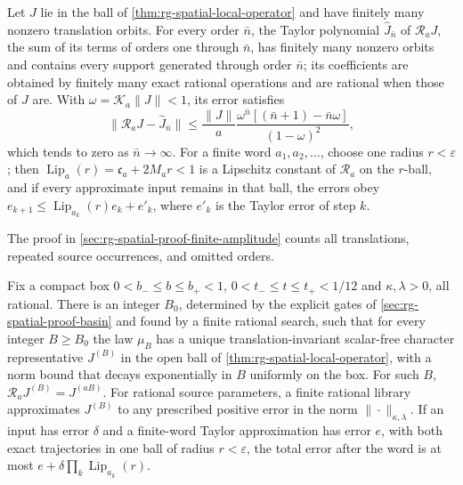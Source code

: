 Let \(J\) lie in the ball of \cref{thm:rg-spatial-local-operator} and have
finitely many nonzero translation orbits. For every order \(\bar n\), the
Taylor polynomial \(\widehat J_{\bar n}\) of \(\mathscr R_aJ\), the sum of
its terms of orders one through \(\bar n\), has finitely many nonzero
orbits and contains every support generated through order \(\bar n\); its
coefficients are obtained by finitely many exact rational operations and
are rational when those of \(J\) are. With
\(\omega=\mathcal K_a\|J\|<1\), its error satisfies
\begin{equation}
 \|\mathscr R_aJ-\widehat J_{\bar n}\|
 \le\frac{\|J\|}{a}
       \frac{\omega^{\bar n}[(\bar n+1)-\bar n\omega]}{(1-\omega)^2},
 \label{eq:rg-spatial-taylor-tail}
\end{equation}
which tends to zero as \(\bar n\to\infty\). For a finite word
\(a_1,a_2,\ldots\), choose one radius \(r<\varepsilon\); then
\(\operatorname{Lip}_a(r)=\mathfrak c_a+2M_ar<1\) is a Lipschitz constant
of \(\mathscr R_a\) on the \(r\)-ball, and if every approximate input
remains in that ball, the errors obey
\(e_{k+1}\le\operatorname{Lip}_{a_k}(r)e_k+e'_k\), where \(e'_k\) is the
Taylor error of step \(k\). 

The proof in \cref{sec:rg-spatial-proof-finite-amplitude} counts all
translations, repeated source occurrences, and omitted orders.

Fix a compact box \(0<b_-\le b\le b_+<1\), \(0<t_-\le t\le t_+<1/12\) and
\(\kappa,\lambda>0\), all rational. There is an integer \(B_0\), determined
by the explicit gates of \cref{sec:rg-spatial-proof-basin} and found by a
finite rational search, such that for every integer \(B\ge B_0\) the law
\(\mu_B\) has a unique translation-invariant scalar-free character
representative \(J^{(B)}\) in the open ball of
\cref{thm:rg-spatial-local-operator}, with a norm bound that decays
exponentially in \(B\) uniformly on the box. For such \(B\),
\(\mathscr R_aJ^{(B)}=J^{(aB)}\). For rational source parameters, a finite
rational library approximates \(J^{(B)}\) to any prescribed positive error
in the norm \(\|\cdot\|_{\kappa,\lambda}\). If an input has error \(\delta\)
and a finite-word Taylor approximation has error \(e\), with both exact
trajectories in one ball of radius \(r<\varepsilon\), the total error after
the word is at most \(e+\delta\prod_k\operatorname{Lip}_{a_k}(r)\).

